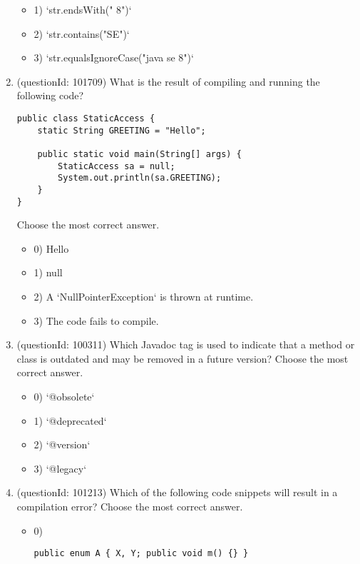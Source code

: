 \documentclass[12pt]{article}
\begin{document}
\begin{enumerate}[label=(\arabic*)]
\begin{itemize}
\item 1) `str.endsWith(" 8")`

\item 2) `str.contains("SE")`

\item 3) `str.equalsIgnoreCase("java se 8")`

\end{itemize}
\item (questionId: 101709) What is the result of compiling and running the following code?\n\begin{verbatim}
public class StaticAccess {
    static String GREETING = "Hello";

    public static void main(String[] args) {
        StaticAccess sa = null;
        System.out.println(sa.GREETING);
    }
}
\end{verbatim}
Choose the most correct answer. 
\begin{itemize}
\item 0) Hello

\item 1) null

\item 2) A `NullPointerException` is thrown at runtime.

\item 3) The code fails to compile.

\end{itemize}
\item (questionId: 100311) Which Javadoc tag is used to indicate that a method or class is outdated and may be removed in a future version?
Choose the most correct answer. 
\begin{itemize}
\item 0) `@obsolete`

\item 1) `@deprecated`

\item 2) `@version`

\item 3) `@legacy`

\end{itemize}
\item (questionId: 101213) Which of the following code snippets will result in a compilation error?
Choose the most correct answer. 
\begin{itemize}
\item 0) \begin{verbatim}public enum A { X, Y; public void m() {} }\end{verbatim}


\end{itemize}
\end{enumerate}
\end{document}
